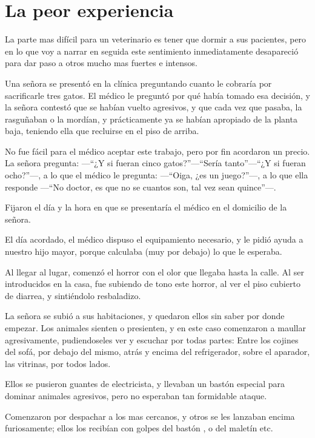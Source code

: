 \documentclass[letterpaper, 12pt]{book}
\begin{document}
\chapter{La peor experiencia}

La parte mas difícil para un veterinario es tener que dormir a sus pacientes, pero en lo que voy a narrar en seguida este sentimiento inmediatamente desapareció para dar paso a otros mucho mas fuertes e intensos.

Una señora se presentó en la clínica preguntando cuanto le cobraría por sacrificarle tres gatos. El médico le preguntó por qué había tomado esa decisión, y la señora contestó que se habían vuelto agresivos, y que cada vez que pasaba, la rasguñaban o la mordían, y prácticamente ya se habían apropiado de la planta baja, teniendo ella que recluirse en el piso de arriba.

No fue fácil para el médico aceptar este trabajo, pero por fin acordaron un precio. La señora pregunta: ---``¿Y si fueran cinco gatos?''---``Sería tanto''---``¿Y si fueran ocho?''---, a lo que el médico le pregunta: ---``Oiga, ¿es un juego?''---, a lo que ella responde ---``No doctor, es que no se cuantos son, tal vez sean quince''---. 

Fijaron el día y la hora en que se presentaría el médico en el domicilio de la señora.

El día acordado, el médico dispuso el equipamiento necesario, y le pidió ayuda a nuestro hijo mayor, porque calculaba (muy por debajo) lo que le esperaba. 

Al llegar al lugar, comenzó el horror con el olor que llegaba hasta la calle. Al ser introducidos en la casa, fue subiendo de tono este horror, al ver el piso cubierto de diarrea, y sintiéndolo resbaladizo.

La señora se subió a sus habitaciones, y quedaron ellos sin saber por donde empezar. Los animales sienten o presienten, y en este caso comenzaron a maullar agresivamente, pudiendoseles ver y escuchar por todas partes: Entre los cojines del sofá, por debajo del mismo, atrás y encima del refrigerador, sobre el aparador, las vitrinas, por todos lados. 

Ellos se pusieron guantes de electricista, y llevaban un bastón especial para dominar animales agresivos, pero no esperaban tan formidable ataque.

Comenzaron por despachar a los mas cercanos, y otros se les lanzaban encima furiosamente; ellos los recibían con golpes del bastón , o del maletín etc.
\end{document}
